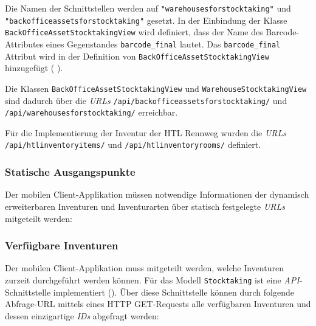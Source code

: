 Die Namen der Schnittstellen werden auf
\texttt{"warehousesforstocktaking"} und
\texttt{"backofficeassetsforstocktaking"} gesetzt. In der Einbindung der
Klasse \texttt{BackOfficeAssetStocktakingView} wird definiert, dass der
Name des Barcode-Attributes eines Gegenstandes \texttt{barcode\_final}
lautet. Das \texttt{barcode\_final} Attribut wird in der Definition von
\texttt{BackOfficeAssetStocktakingView} hinzugefügt (\sa{}
).

Die Klassen \texttt{BackOfficeAssetStocktakingView} und
\texttt{WarehouseStocktakingView} sind dadurch über die \emph{URLs}
\texttt{/api/backofficeassetsforstocktaking/} und
\texttt{/api/warehousesforstocktaking/} erreichbar.

Für die Implementierung der Inventur der HTL Rennweg wurden die
\emph{URLs} 
\texttt{/api/htlinventoryitems/} und \texttt{/api/htlinventoryrooms/}
definiert.

\hypertarget{statische-ausgangspunkte}{%
\subsubsection{Statische
Ausgangspunkte}\label{statische-ausgangspunkte}}

Der mobilen Client-Applikation müssen notwendige Informationen der
dynamisch erweiterbaren Inventuren und Inventurarten über statisch
festgelegte \emph{URLs} 
mitgeteilt werden:

\subsubsection*{Verfügbare Inventuren}

Der mobilen Client-Applikation muss mitgeteilt werden, welche Inventuren
zurzeit durchgeführt werden können. Für das Modell \texttt{Stocktaking}
ist eine
\emph{API}-Schnittstelle
implementiert (). Über diese Schnittstelle können
durch folgende Abfrage-URL mittels eines HTTP GET-Requests
\cite{rest-http-methods} alle verfügbaren Inventuren und dessen
einzigartige \emph{IDs}
abgefragt werden:

